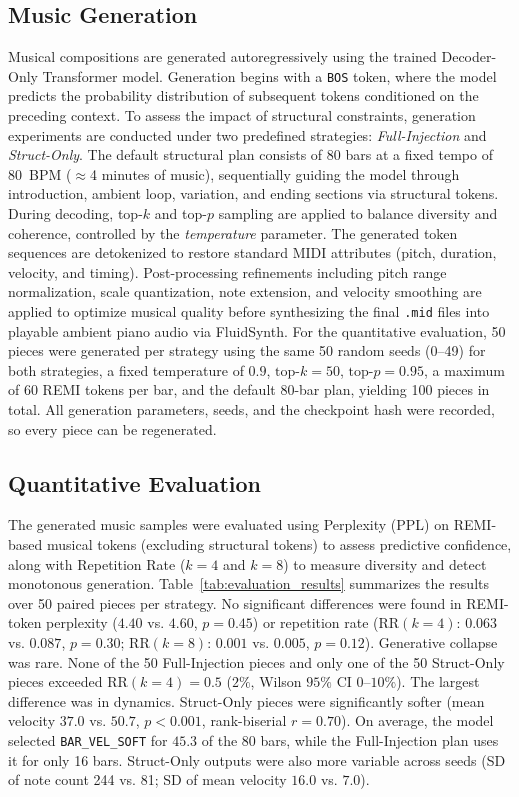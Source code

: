 \documentclass[conference,a4paper]{IEEEtran}
\begin{document}
\subsection{Music Generation}
Musical compositions are generated autoregressively using the trained Decoder-Only Transformer model. Generation begins with a \texttt{BOS} token, where the model predicts the probability distribution of subsequent tokens conditioned on the preceding context. To assess the impact of structural constraints, generation experiments are conducted under two predefined strategies: \textit{Full-Injection} and \textit{Struct-Only}. The default structural plan consists of 80 bars at a fixed tempo of 80~BPM ($\approx$4 minutes of music), sequentially guiding the model through introduction, ambient loop, variation, and ending sections via structural tokens.
During decoding, top-$k$ and top-$p$ sampling are applied to balance diversity and coherence, controlled by the \textit{temperature} parameter. The generated token sequences are detokenized to restore standard MIDI attributes (pitch, duration, velocity, and timing). Post-processing refinements including pitch range normalization, scale quantization, note extension, and velocity smoothing are applied to optimize musical quality before synthesizing the final \texttt{.mid} files into playable ambient piano audio via FluidSynth. For the quantitative evaluation, 50 pieces were generated per strategy using the same 50 random seeds (0--49) for both strategies, a fixed temperature of $0.9$, $\text{top-}k = 50$, $\text{top-}p = 0.95$, a maximum of 60 REMI tokens per bar, and the default 80-bar plan, yielding 100 pieces in total. All generation parameters, seeds, and the checkpoint hash were recorded, so every piece can be regenerated.

\subsection{Quantitative Evaluation}

The generated music samples were evaluated using Perplexity (PPL) on REMI-based musical tokens (excluding structural tokens) to assess predictive confidence, along with Repetition Rate ($k=4$ and $k=8$) to measure diversity and detect monotonous generation. Table~\ref{tab:evaluation_results} summarizes the results over 50 paired pieces per strategy. No significant differences were found in REMI-token perplexity ($4.40$ vs. $4.60$, $p = 0.45$) or repetition rate ($\text{RR}(k=4)$: $0.063$ vs. $0.087$, $p = 0.30$; $\text{RR}(k=8)$: $0.001$ vs. $0.005$, $p = 0.12$). Generative collapse was rare. None of the 50 Full-Injection pieces and only one of the 50 Struct-Only pieces exceeded $\text{RR}(k=4) = 0.5$ ($2\%$, Wilson $95\%$ CI $0\text{--}10\%$). The largest difference was in dynamics. Struct-Only pieces were significantly softer (mean velocity $37.0$ vs. $50.7$, $p < 0.001$, rank-biserial $r = 0.70$). On average, the model selected \texttt{BAR\_VEL\_SOFT} for $45.3$ of the 80 bars, while the Full-Injection plan uses it for only 16 bars. Struct-Only outputs were also more variable across seeds (SD of note count 244 vs. 81; SD of mean velocity $16.0$ vs. $7.0$).
\end{document}
